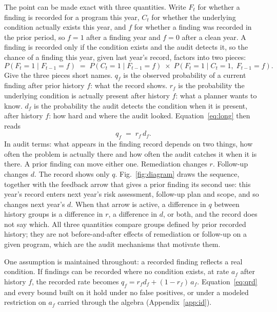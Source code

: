The point can be made exact with three quantities. Write $F_t$ for whether a
finding is recorded for a program this year, $C_t$ for whether the underlying
condition actually exists this year, and $f$ for whether a finding was recorded
in the prior period, so $f = 1$ after a finding year and $f = 0$ after a clean
year. A finding is recorded only if the condition exists and the audit detects
it, so the chance of a finding this year, given last year's record, factors
into two pieces:
%
\begin{equation}\label{eq:long}
  P(F_t = 1 \mid F_{t-1} = f)
  \;=\;
  P(C_t = 1 \mid F_{t-1} = f)
  \;\times\;
  P(F_t = 1 \mid C_t = 1,\; F_{t-1} = f) .
\end{equation}
%
Give the three pieces short names. $q_f$ is the observed probability of a
current finding after prior history $f$: what the record shows. $r_f$ is the
probability the underlying condition is actually present after history $f$:
what a planner wants to know. $d_f$ is the probability the audit detects the
condition when it is present, after history $f$: how hard and where the audit
looked. Equation~\eqref{eq:long} then reads
%
\begin{equation}\label{eq:qrd}
  q_f \;=\; r_f \, d_f .
\end{equation}
%
In audit terms: what appears in the finding record depends on two things, how
often the problem is actually there and how often the audit catches it when it
is there. A prior finding can move either one. Remediation changes $r$.
Follow-up changes $d$. The record shows only $q$. Fig.~\ref{fig:diagram}
draws the sequence, together with the feedback arrow that gives a prior finding
its second use: this year's record enters next year's risk assessment,
follow-up plan and scope, and so changes next year's $d$. When that arrow is
active, a difference in $q$ between history groups is a difference in $r$, a
difference in $d$, or both, and the record does not say which. All three
quantities compare groups defined by prior recorded history; they are not
before-and-after effects of remediation or follow-up on a given program, which
are the audit mechanisms that motivate them.

One assumption is maintained throughout: a recorded finding reflects a real
condition. If findings can be recorded where no condition exists, at rate
$a_f$ after history $f$, the recorded rate becomes $q_f = r_f d_f +
(1 - r_f)\, a_f$. Equation~\eqref{eq:qrd} and every bound built on it hold
under no false positives, or under a modeled restriction on $a_f$ carried
through the algebra (Appendix~\ref{app:id}).

